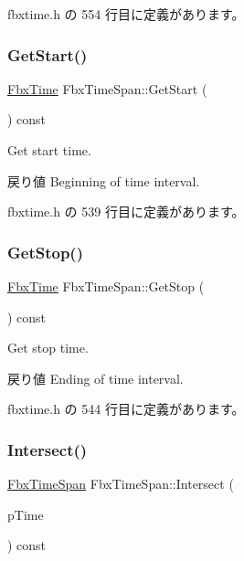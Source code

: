  fbxtime.\+h の 554 行目に定義があります。

\mbox{\label{class_fbx_time_span_a262c2fedcf2bdf205554df6fc8c7f7b9}} 
\subsubsection{\texorpdfstring{Get\+Start()}{GetStart()}}
{\footnotesize\ttfamily \hyperlink{class_fbx_time}{Fbx\+Time} Fbx\+Time\+Span\+::\+Get\+Start (\begin{DoxyParamCaption}{ }\end{DoxyParamCaption}) const\hspace{0.3cm}{\ttfamily [inline]}}

Get start time. \begin{DoxyReturn}{戻り値}
Beginning of time interval. 
\end{DoxyReturn}


 fbxtime.\+h の 539 行目に定義があります。

\mbox{\label{class_fbx_time_span_a1d5362bd784ccd554a2c6faad2227c9b}} 
\subsubsection{\texorpdfstring{Get\+Stop()}{GetStop()}}
{\footnotesize\ttfamily \hyperlink{class_fbx_time}{Fbx\+Time} Fbx\+Time\+Span\+::\+Get\+Stop (\begin{DoxyParamCaption}{ }\end{DoxyParamCaption}) const\hspace{0.3cm}{\ttfamily [inline]}}

Get stop time. \begin{DoxyReturn}{戻り値}
Ending of time interval. 
\end{DoxyReturn}


 fbxtime.\+h の 544 行目に定義があります。

\mbox{\label{class_fbx_time_span_a8be395bd3e5dfbdcd2bc1551832e04b1}} 
\subsubsection{\texorpdfstring{Intersect()}{Intersect()}}
{\footnotesize\ttfamily \hyperlink{class_fbx_time_span}{Fbx\+Time\+Span} Fbx\+Time\+Span\+::\+Intersect (\begin{DoxyParamCaption}\item[{const \hyperlink{class_fbx_time_span}{Fbx\+Time\+Span} \&}]{p\+Time }\end{DoxyParamCaption}) const}

